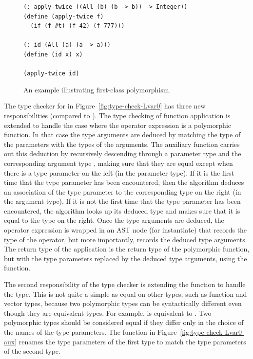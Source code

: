 \documentclass[7x10,nocrop]{TimesAPriori_MIT}%
\begin{document}
\begin{figure}[tbp]
\begin{lstlisting}
(: apply-twice ((All (b) (b -> b)) -> Integer))
(define (apply-twice f)
  (if (f #t) (f 42) (f 777)))

(: id (All (a) (a -> a)))
(define (id x) x)

(apply-twice id)
\end{lstlisting}
\caption{An example illustrating first-class polymorphism.}
\label{fig:apply-twice}
\end{figure}

The type checker for \LangPoly{} in Figure~\ref{fig:type-check-Lvar0} has
three new responsibilities (compared to \LangLoop{}). The type checking of
function application is extended to handle the case where the operator
expression is a polymorphic function. In that case the type arguments
are deduced by matching the type of the parameters with the types of
the arguments.
%
The  auxiliary function carries out this deduction
by recursively descending through a parameter type  and the
corresponding argument type , making sure that they are equal
except when there is a type parameter on the left (in the parameter
type). If it is the first time that the type parameter has been
encountered, then the algorithm deduces an association of the type
parameter to the corresponding type on the right (in the argument
type). If it is not the first time that the type parameter has been
encountered, the algorithm looks up its deduced type and makes sure
that it is equal to the type on the right.
%
Once the type arguments are deduced, the operator expression is
wrapped in an  AST node (for instantiate) that records the
type of the operator, but more importantly, records the deduced type
arguments. The return type of the application is the return type of
the polymorphic function, but with the type parameters replaced by the
deduced type arguments, using the  function.

The second responsibility of the type checker is extending the
function  to handle the  type.  This is
not quite a simple as equal on other types, such as function and
vector types, because two polymorphic types can be syntactically
different even though they are equivalent types. For example,
 is equivalent to .
Two polymorphic types should be considered equal if they differ only
in the choice of the names of the type parameters. The
 function in Figure~\ref{fig:type-check-Lvar0-aux}
renames the type parameters of the first type to match the type
parameters of the second type.
\end{document}
